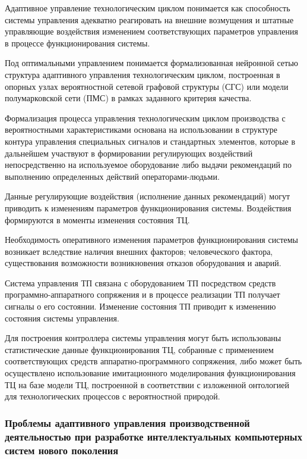 Адаптивное управление технологическим циклом понимается как способность системы управления адекватно реагировать на внешние возмущения и штатные управляющие воздействия изменением соответствующих параметров управления в процессе функционирования системы.

Под оптимальными управлением понимается формализованная нейронной сетью структура адаптивного управления технологическим циклом, построенная в опорных узлах вероятностной сетевой графовой структуры (СГС) или модели полумарковской сети (ПМС) в рамках заданного критерия качества.

Формализация процесса управления технологическим циклом производства с  вероятностными характеристиками основана на использовании в структуре контура управления специальных сигналов и стандартных элементов, которые в дальнейшем участвуют в формировании регулирующих воздействий непосредственно на используемое оборудование либо выдачи рекомендаций по выполнению определенных действий операторами-людьми.

Данные регулирующие воздействия (исполнение данных рекомендаций) могут приводить к изменениям параметров функционирования системы. Воздействия формируются в моменты изменения состояния ТЦ.

Необходимость оперативного изменения параметров функционирования системы возникает вследствие наличия внешних факторов; человеческого фактора, существования возможности возникновения отказов оборудования и аварий.

Система управления ТП связана с оборудованием ТП посредством средств программно-аппаратного сопряжения и в процессе реализации ТП получает сигналы о его состоянии. Изменение состояния ТП приводит к изменению состояния системы управления.

Для построения контроллера системы управления могут быть использованы статистические данные функционирования ТЦ, собранные с применением соответствующих средств аппаратно-программного сопряжения, либо может быть осуществлено использование имитационного моделирования функционирования ТЦ на базе модели ТЦ, построенной в соответствии с изложенной онтологией для технологических процессов с вероятностной природой.



\subsubsection{Проблемы адаптивного управления производственной деятельностью при разработке интеллектуальных компьютерных систем нового поколения}

